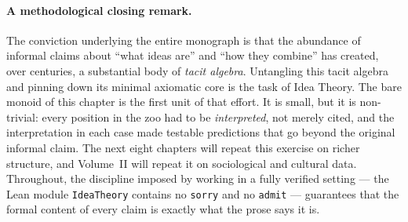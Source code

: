 \paragraph{A methodological closing remark.}
The conviction underlying the entire monograph is that the abundance of
informal claims about ``what ideas are'' and ``how they combine'' has
created, over centuries, a substantial body of \emph{tacit algebra}.
Untangling this tacit algebra and pinning down its minimal axiomatic
core is the task of Idea Theory.  The bare monoid of this chapter is the
first unit of that effort.  It is small, but it is non-trivial: every
position in the zoo had to be \emph{interpreted}, not merely cited, and
the interpretation in each case made testable predictions that go
beyond the original informal claim.  The next eight chapters will repeat
this exercise on richer structure, and Volume~II will repeat it on
sociological and cultural data.  Throughout, the discipline imposed by
working in a fully verified setting --- the Lean module
\texttt{IdeaTheory} contains no \texttt{sorry} and no \texttt{admit}
--- guarantees that the formal content of every claim is exactly what
the prose says it is.


